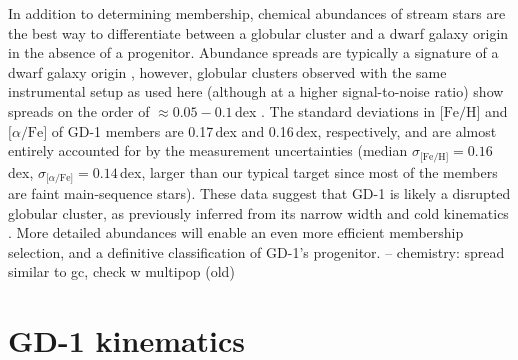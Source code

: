 \documentclass[twocolumn]{aastex63}
\newcommand{\feh}{\ensuremath{\textrm{[Fe/H]}}}
\newcommand{\afe}{\ensuremath{\textrm{[$\alpha$/Fe]}}}
\begin{document}
In addition to determining membership, chemical abundances of stream stars are the best way to differentiate between a globular cluster and a dwarf galaxy origin in the absence of a progenitor.
Abundance spreads are typically a signature of a dwarf galaxy origin \citep[e.g.,][]{willman2012}, however, globular clusters observed with the same instrumental setup as used here (although at a higher signal-to-noise ratio) show spreads on the order of $\approx0.05-0.1$\,dex \citep{cargile2019}.
The standard deviations in $\feh$ and $\afe$ of GD-1 members are 0.17\,dex and 0.16\,dex, respectively, and are almost entirely accounted for by the measurement uncertainties (median $\sigma_\feh=0.16$\,dex, $\sigma_\afe=0.14$\,dex, larger than our typical target since most of the members are faint main-sequence stars).
These data suggest that GD-1 is likely a disrupted globular cluster, as previously inferred from its narrow width \citep[e.g.,][]{grillmair2006} and cold kinematics \citep[e.g.,][]{malhan2019}.
More detailed abundances will enable an even more efficient membership selection, and a definitive classification of GD-1's progenitor.
-- chemistry: spread similar to gc, check w multipop (old)


\section{GD-1 kinematics}
\label{sec:kinematics}
\end{document}
